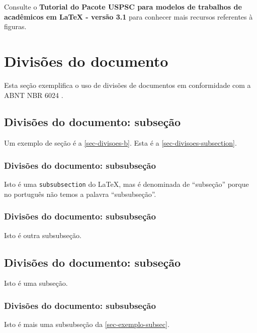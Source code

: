 Consulte o \textbf{Tutorial do Pacote USPSC para modelos de trabalhos de acad\^emicos em LaTeX - vers\~ao 3.1} para conhecer mais recursos referentes \`a figuras. 

\section{Divis\~oes do documento}\label{sec-divisoes-b}
Esta se\c{c}\~ao exemplifica o uso de divis\~oes de documentos em conformidade com a ABNT NBR 6024  \cite{nbr6024}.
\subsection{Divis\~oes do documento: subse\c{c}\~ao}\label{sec-divisoes-subsection}

Um exemplo de se\c{c}\~ao \'e a \autoref{sec-divisoes-b}. Esta \'e a \autoref{sec-divisoes-subsection}.

\subsubsection{Divis\~oes do documento: subsubse\c{c}\~ao}\label{sec-divisoes-subsubsection}

Isto \'e uma \texttt{subsubsection} do \LaTeX, mas \'e denominada de ``subse\c{c}\~ao'' porque no portugu\^es n\~ao temos a palavra ``subsubse\c{c}\~ao''.

\subsubsection{Divis\~oes do documento: subsubse\c{c}\~ao}

Isto \'e outra subsubse\c{c}\~ao.

\subsection{Divis\~oes do documento: subse\c{c}\~ao}\label{sec-exemplo-subsec}

Isto \'e uma subse\c{c}\~ao.

\subsubsection{Divis\~oes do documento: subsubse\c{c}\~ao}

Isto \'e mais uma subsubse\c{c}\~ao da \autoref{sec-exemplo-subsec}.


\label{sec-exemplo-subsubsubsection}

